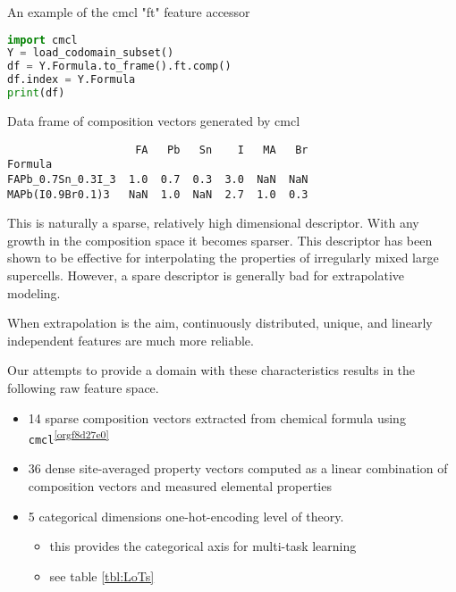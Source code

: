 \begin{ZZlisting}
  \caption{\label{lst:cmcl} An example of the cmcl "ft" feature accessor}
  \begin{CenteredBox}
    \begin{lstlisting}[language=python]
import cmcl
Y = load_codomain_subset()
df = Y.Formula.to_frame().ft.comp()
df.index = Y.Formula
print(df)
    \end{lstlisting}
  \end{CenteredBox}
\end{ZZlisting}

\begin{ZZlisting}
  \caption{\label{lst:cdf} Data frame of composition vectors generated by cmcl}
  \begin{CenteredBox}
    \begin{lstlisting}
                    FA   Pb   Sn    I   MA   Br
Formula                                        
FAPb_0.7Sn_0.3I_3  1.0  0.7  0.3  3.0  NaN  NaN
MAPb(I0.9Br0.1)3   NaN  1.0  NaN  2.7  1.0  0.3
    \end{lstlisting}
  \end{CenteredBox}
\end{ZZlisting}

This is naturally a sparse, relatively high dimensional descriptor.
With any growth in the composition space it becomes sparser.
This descriptor has been shown to be effective for interpolating the properties of irregularly mixed large supercells.
\autocite{mannodi-kanakkithodi-2022-data-driven}
However, a spare descriptor is generally bad for extrapolative modeling.
\autocite{ghiringhelli-2015-big-data} 

When extrapolation is the aim, continuously distributed, unique, and linearly independent features are much more reliable.
\autocite{lux-2020-inter-spars} 

Our attempts to provide a domain with these characteristics results in the following raw feature space.

\begin{itemize}
\item 14 sparse composition vectors extracted from chemical formula using \texttt{cmcl}\textsuperscript{\ref{orgf8d27e0}}
\item 36 dense site-averaged property vectors computed as a linear combination of composition vectors and measured elemental properties \autocite{mentel-2014}
\item 5 categorical dimensions one-hot-encoding level of theory.
\begin{itemize}
\item this provides the categorical axis for multi-task learning
\item see table \ref{tbl:LoTs}
\end{itemize}
\end{itemize}

